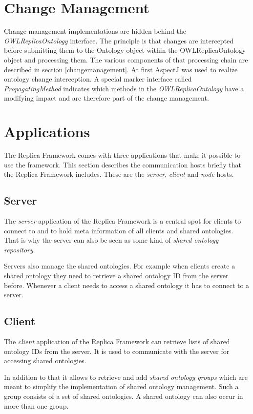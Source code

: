 \section{Change Management}
Change management implementations are hidden behind the \emph{OWLReplicaOntology}
interface. The principle is that changes are intercepted before submitting
them to the Ontology object within the OWLReplicaOntology object and
processing them. The various components of that processing chain are
described in section \ref{changemanagement}.
At first AspectJ was used to realize ontology change interception.
A special marker interface called \emph{PropagatingMethod} indicates
which methods in the \emph{OWLReplicaOntology} have a modifying impact
and are therefore part of the change management.


\newpage
\section{Applications}
The Replica Framework comes with three applications that make it possible
to use the framework.
This section describes the communication hosts briefly that
the Replica Framework includes.
These are the \emph{server}, \emph{client} and \emph{node} hosts.

\subsection{Server}
The \emph{server} application of the Replica Framework is a central spot for
clients to connect to and to hold meta information of all clients and
shared ontologies. That is why the server can also be seen as some kind
of \emph{shared ontology repository}.

Servers also manage the shared ontologies. For example when clients create a shared
ontology they need to retrieve a shared ontology ID from the server before.
Whenever a client needs to access a shared ontology it has to connect to
a server.

\subsection{Client}
The \emph{client} application of the Replica Framework can retrieve lists of
shared ontology IDs from the server. It is used to communicate with the
server for accessing shared ontologies.

In addition to that it allows to retrieve and add \emph{shared ontology groups}
which are meant to simplify the implementation of shared ontology management.
Such a group consists of a set of shared ontologies.
A shared ontology can also occur in more than one group.

